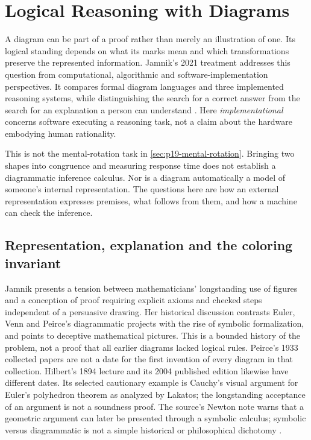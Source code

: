 \chapter{Logical Reasoning with Diagrams}
\label{sec:p12-rationality-13-1}

A diagram can be part of a proof rather than merely an illustration of
one. Its logical standing depends on what its marks mean and which
transformations preserve the represented information. Jamnik's 2021
treatment addresses this question from computational, algorithmic and
software-implementation perspectives. It compares formal diagram
languages and three implemented reasoning systems, while distinguishing
the search for a correct answer from the search for an explanation a
person can understand \cite[pp.~715--723]{Jamnik2021LogicalDiagrams}.
Here \emph{implementational} concerns software executing a reasoning
task, not a claim about the hardware embodying human rationality.

This is not the mental-rotation task in
\cref{sec:p19-mental-rotation}. Bringing two shapes into congruence and
measuring response time does not establish a diagrammatic inference
calculus. Nor is a diagram automatically a model of someone's internal
representation. The questions here are how an external representation
expresses premises, what follows from them, and how a machine can check
the inference.

\section{Representation, explanation and the coloring invariant}

Jamnik presents a tension between mathematicians' longstanding use of
figures and a conception of proof requiring explicit axioms and checked
steps independent of a persuasive drawing. Her historical discussion
contrasts Euler, Venn and Peirce's diagrammatic projects with the rise of
symbolic formalization, and points to deceptive mathematical pictures.
This is a bounded history of the problem, not a proof that all earlier
diagrams lacked logical rules. Peirce's 1933 collected papers are not a
date for the first invention of every diagram in that collection.
Hilbert's 1894 lecture and its 2004 published edition likewise have
different dates. Its selected cautionary example is Cauchy's visual
argument for Euler's polyhedron theorem as analyzed by Lakatos; the
longstanding acceptance of an argument is not a soundness proof.
The source's Newton note warns that a geometric argument
can later be presented through a symbolic calculus; symbolic versus
diagrammatic is not a simple historical or philosophical dichotomy
\cite[pp.~715,722, notes~1--2]{Jamnik2021LogicalDiagrams}.

